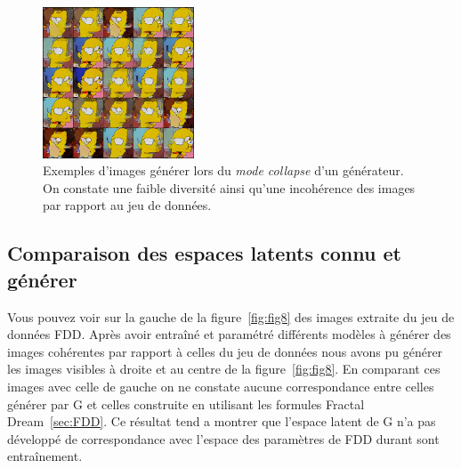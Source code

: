 \documentclass[11pt,francais]{article}
\begin{document}
\begin{figure}[h!]
    \centering
    \includegraphics[width=0.40\textwidth]{Figures/LossG_et_Convergeance/collapse_980.png}
    \caption{Exemples d'images générer lors du \textit{mode collapse} d'un générateur. On constate une faible diversité ainsi qu'une incohérence des images par rapport au jeu de données.}
    \label{fig:fig7}
\end{figure}

\subsection{Comparaison des espaces latents connu et générer}
\label{sec:ComparaisonLS}
Vous pouvez voir sur la gauche de la figure~\ref{fig:fig8} des images extraite du jeu de données FDD. Après avoir entraîné et paramétré différents modèles à générer des images cohérentes par rapport à celles du jeu de données nous avons pu générer les images visibles à droite et au centre de la figure~\ref{fig:fig8}. 
En comparant ces images avec celle de gauche on ne constate aucune correspondance entre celles générer par G et celles construite en utilisant les formules Fractal Dream~\ref{sec:FDD}. 
Ce résultat tend a montrer que l'espace latent de G n'a pas développé de correspondance avec l'espace des paramètres de FDD durant sont entraînement.
\end{document}
